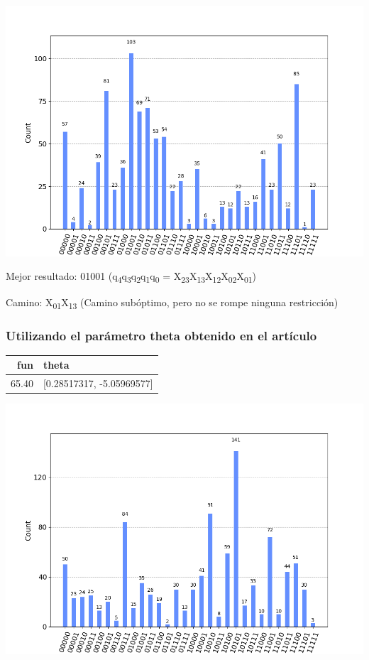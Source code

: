 \documentclass[letterpaper]{article}
\begin{document}
\begin{center}
\includegraphics[scale=0.5]{./img/primer_paper_aer_suboptimo.png}
\end{center}

Mejor resultado: 01001 (q\textsubscript{4}q\textsubscript{3}q\textsubscript{2}q\textsubscript{1}q\textsubscript{0} = X\textsubscript{23}X\textsubscript{13}X\textsubscript{12}X\textsubscript{02}X\textsubscript{01})

Camino: X\textsubscript{01}X\textsubscript{13} (Camino subóptimo, pero no se rompe ninguna restricción)

\newpage

\subsubsection{Utilizando el parámetro \textbf{theta} obtenido en el artículo}
\label{sec:org90b282c}

\begin{center}
\begin{tabular}{|r|l|}
\hline
\textbf{fun} & \textbf{theta}\\
\hline
65.40 & [0.28517317, -5.05969577]\\
\hline
\end{tabular}
\end{center}

\begin{center}
\includegraphics[scale=0.5]{./img/primer_paper_aer_resultado.png}
\end{center}
\end{document}
